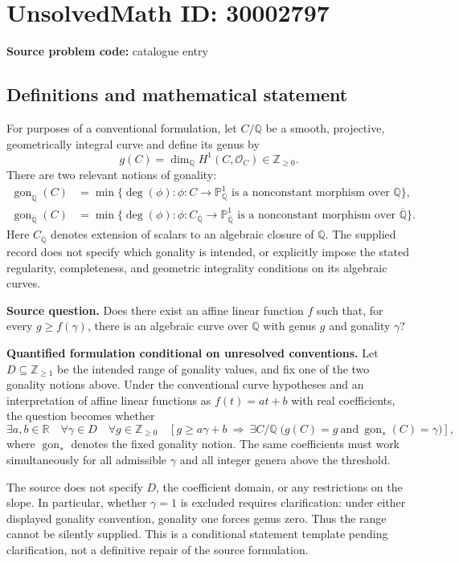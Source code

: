 \documentclass[11pt]{article}
\newcommand{\Z}{\mathbb{Z}}
\newcommand{\Q}{\mathbb{Q}}
\newcommand{\R}{\mathbb{R}}
\newcommand{\PP}{\mathbb{P}}
\begin{document}
\section*{UnsolvedMath ID: 30002797}
\textbf{Source problem code:} catalogue entry
\subsection{Definitions and mathematical statement}
For purposes of a conventional formulation, let \(C/\Q\) be a smooth, projective, geometrically integral curve and define its genus by
\[
 g(C)=\dim_{\Q}H^1(C,\mathcal O_C)\in\Z_{\geq 0}.
\]
There are two relevant notions of gonality:
\[
\begin{aligned}
\operatorname{gon}_{\Q}(C)
&=\min\{\deg(\phi):\phi:C\to\PP^1_{\Q}\text{ is a nonconstant morphism over }\Q\},\\
\operatorname{gon}_{\overline{\Q}}(C)
&=\min\{\deg(\phi):\phi:C_{\overline{\Q}}\to\PP^1_{\overline{\Q}}\text{ is a nonconstant morphism over }\overline{\Q}\}.
\end{aligned}
\]
Here \(C_{\overline{\Q}}\) denotes extension of scalars to an algebraic closure of \(\Q\). The supplied record does not specify which gonality is intended, or explicitly impose the stated regularity, completeness, and geometric integrality conditions on its algebraic curves.

\textbf{Source question.} Does there exist an affine linear function \(f\) such that, for every \(g\geq f(\gamma)\), there is an algebraic curve over \(\Q\) with genus \(g\) and gonality \(\gamma\)?

\textbf{Quantified formulation conditional on unresolved conventions.} Let \(D\subseteq\Z_{\geq 1}\) be the intended range of gonality values, and fix one of the two gonality notions above. Under the conventional curve hypotheses and an interpretation of affine linear functions as \(f(t)=at+b\) with real coefficients, the question becomes whether
\[
\exists a,b\in\R\quad
\forall\gamma\in D\quad
\forall g\in\Z_{\geq0}\quad
\left[g\geq a\gamma+b\ \Longrightarrow\
\exists C/\Q\;\bigl(g(C)=g\ \text{and}\ \operatorname{gon}_{*}(C)=\gamma\bigr)\right],
\]
where \(\operatorname{gon}_{*}\) denotes the fixed gonality notion. The same coefficients must work simultaneously for all admissible \(\gamma\) and all integer genera above the threshold.

The source does not specify \(D\), the coefficient domain, or any restrictions on the slope. In particular, whether \(\gamma=1\) is excluded requires clarification: under either displayed gonality convention, gonality one forces genus zero. Thus the range cannot be silently supplied. This is a conditional statement template pending clarification, not a definitive repair of the source formulation.
\end{document}

